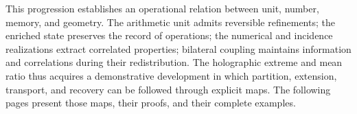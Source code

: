 This progression establishes an operational relation between unit,
number, memory, and geometry. The arithmetic unit admits
reversible refinements; the enriched state preserves the
record of operations; the numerical and incidence
realizations extract correlated properties; bilateral coupling
maintains information and correlations during their
redistribution. The holographic extreme and mean ratio thus acquires
a demonstrative development in which partition, extension,
transport, and recovery can be followed through explicit
maps. The following pages present those maps,
their proofs, and their complete examples.
